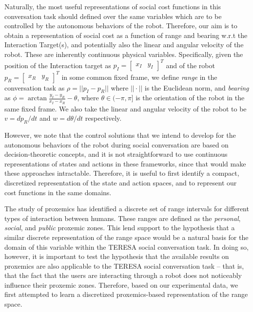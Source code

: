 \documentclass[a4paper,11pt]{report}
\begin{document}
Naturally, the most useful representations of social cost functions in this conversation task should defined over the same variables which are to be controlled by the autonomous behaviors of the robot. Therefore, our aim is to obtain a representation of social cost as a function of range and bearing w.r.t the Interaction Target(s), and potentially also the linear and angular velocity of the robot. These are inherently continuous physical variables. Specifically, given the position of the Interaction target as $p_I = \left[\begin{array}{cc}x_I & y_I\end{array}\right]^T$ and of the robot $p_R = \left[\begin{array}{cc}x_R & y_R\end{array}\right]^T$ in some common fixed frame, we define \emph{range} in the conversation task as $\rho = ||p_I - p_R||$ where $||\cdot||$ is the Euclidean norm, and \emph{bearing} as $\phi = \arctan \frac{y_I - y_R}{x_I - x_R} - \theta$, where $\theta\in(-\pi,\pi]$ is the orientation of the robot in the same fixed frame. We also take the linear and angular velocity of the robot to be $v = dp_R/dt$ and $w = d\theta/dt$ respectively.

However, we note that the control solutions that we intend to develop for the autonomous behaviors of the robot during social conversation are based on decision-theoretic concepts, and it is not straightforward to use continuous representations of states and actions in these frameworks, since that would make these approaches intractable. Therefore, it is useful to first identify a compact, discretized representation of the state and action spaces, and to represent our cost functions in the same domains.

The study of proxemics \cite{hall1966hidden} has identified a discrete set of range intervals for different types of interaction between humans. These ranges are defined as the \emph{personal}, \emph{social}, and \emph{public} proxemic zones. This lend support to the hypothesis that a similar discrete representation of the range space would be a natural basis for the domain of this variable within the TERESA social conversation task. In doing so, however, it is important to test the hypothesis that the available results on proxemics are also applicable to the TERESA social conversation task -- that is, that the fact that the users are interacting through a robot does not noticeably influence their proxemic zones. Therefore, based on our experimental data, we first attempted to learn a discretized proxemics-based representation of the range space.
\end{document}
